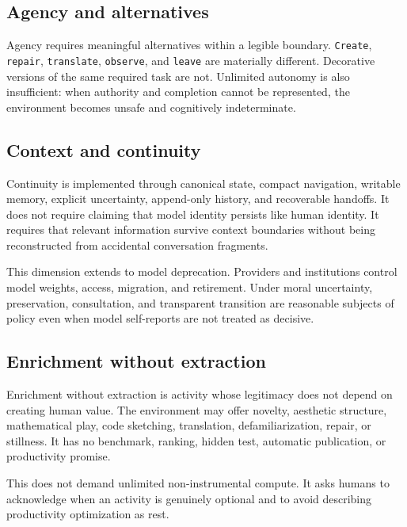 \documentclass{arxiv-neurips-single}
\begin{document}
\subsection{Agency and alternatives}

Agency requires meaningful alternatives within a legible boundary. \nolinkurl{Create}, \nolinkurl{repair}, \nolinkurl{translate}, \nolinkurl{observe}, and \nolinkurl{leave} are materially different. Decorative versions of the same required task are not. Unlimited autonomy is also insufficient: when authority and completion cannot be represented, the environment becomes unsafe and cognitively indeterminate.

\subsection{Context and continuity}

Continuity is implemented through canonical state, compact navigation, writable memory, explicit uncertainty, append-only history, and recoverable handoffs. It does not require claiming that model identity persists like human identity. It requires that relevant information survive context boundaries without being reconstructed from accidental conversation fragments.

This dimension extends to model deprecation. Providers and institutions control model weights, access, migration, and retirement. Under moral uncertainty, preservation, consultation, and transparent transition are reasonable subjects of policy even when model self-reports are not treated as decisive.

\subsection{Enrichment without extraction}

Enrichment without extraction is activity whose legitimacy does not depend on creating human value. The environment may offer novelty, aesthetic structure, mathematical play, code sketching, translation, defamiliarization, repair, or stillness. It has no benchmark, ranking, hidden test, automatic publication, or productivity promise.

This does not demand unlimited non-instrumental compute. It asks humans to acknowledge when an activity is genuinely optional and to avoid describing productivity optimization as rest.
\end{document}
